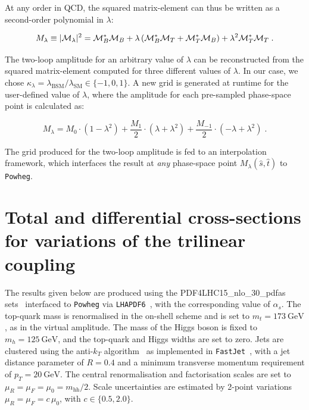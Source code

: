 \documentclass[a4paper]{jpconf}
\newcommand{\GeV}{\ensuremath{\mathrm{\:GeV}}}
\newcommand{\chhh}{\ensuremath{\kappa_{\lambda}}}
\begin{document}
At any order in QCD, the squared matrix-element can thus be written as a second-order polynomial in $\lambda$:

\begin{equation}
M_{\lambda} \equiv |{\cal M}_\lambda|^2=\mathcal{M}_B^* \mathcal{M}_B + \lambda \left( \mathcal{M}_B^* \mathcal{M}_T + \mathcal{M}_T^* \mathcal{M}_B  \right) +  \lambda^2 \mathcal{M}_T^* \mathcal{M}_T \;.
\label{eq:2ndorder}
\end{equation}

The two-loop amplitude for an arbitrary value of $\lambda$ can be reconstructed from the squared matrix-element computed for three different values of $\lambda$. In our case, we chose $\chhh=\lambda_{\mathrm{BSM}}/\lambda_{\mathrm{SM}} \in \lbrace -1, 0, 1 \rbrace$. A new grid is generated at runtime for the user-defined value of $\lambda$, where the amplitude for each pre-sampled phase-space point is calculated as:
	
\begin{equation}
M_{\lambda} =M_0\cdot(1-\lambda^2)+\frac{M_1}{2}\cdot(\lambda+\lambda^2) + \frac{M_{-1}}{2}\cdot(-\lambda+\lambda^2)\;.
\end{equation}

The grid produced for the two-loop amplitude is fed to an interpolation framework, which interfaces the result at \textit{any} phase-space point $M_{\lambda}(\hat{s}, \hat{t})$ to \texttt{Powheg}.




\section{Total and differential cross-sections for variations of the trilinear coupling}

The results given below are produced using the PDF4LHC15\_nlo\_30\_pdfas sets~\cite{Butterworth:2015oua,CT14,MMHT14,NNPDF} interfaced to \texttt{Powheg} via \texttt{LHAPDF6}~\cite{Buckley:2014ana}, with the corresponding value of $\alpha_s$. The top-quark mass is renormalised in the on-shell scheme and is set to $m_t=173 \GeV$, as in the virtual amplitude. The mass of the Higgs boson is fixed to $m_h=125 \GeV$, and the top-quark and Higgs widths are set to zero. Jets are clustered using the anti-$k_T$ algorithm~\cite{Cacciari:2008gp} as implemented in \texttt{FastJet}~\cite{Cacciari:2005hq, Cacciari:2011ma}, with a jet distance parameter of $R=0.4$ and a minimum transverse momentum requirement of $p_{T} = 20 \GeV$. The central renormalisation and factorisation scales are set to $\mu_R = \mu_F = \mu_0 = m_{\mathrm{hh}} / 2$. Scale uncertainties are estimated by 2-point variations $\mu_R = \mu_F = c\, \mu_0$, with $c \in \lbrace {0.5, 2.0} \rbrace$.
\end{document}
